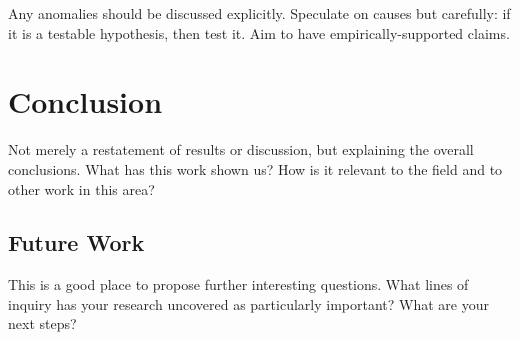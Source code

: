 \documentclass[12pt]{article} %
\begin{document}
Any anomalies should be discussed explicitly. Speculate on causes but carefully: if it is a testable hypothesis, then test it. Aim to have empirically-supported claims.

\section{Conclusion}
Not merely a restatement of results or discussion, but explaining the overall conclusions. What has this work shown us? How is it relevant to the field and to other work in this area?

\subsection{Future Work}
\label{sec:future}
This is a good place to propose further interesting questions. What lines of inquiry has your research uncovered as particularly important? What are your next steps?




\end{document}
